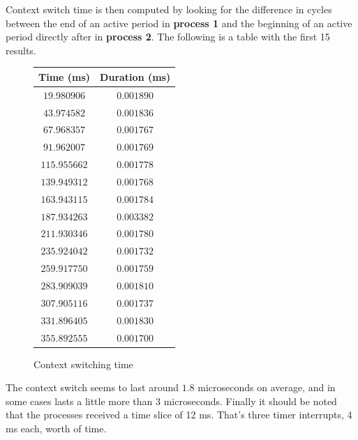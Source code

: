 \documentclass[oneside]{amsart}
\theoremstyle{definition}
\theoremstyle{remark}
\numberwithin{equation}{section}
\begin{document}
Context switch time is then computed by looking for the difference in cycles between the end of an
active period in \textbf{process 1} and the beginning of an active period directly after in
\textbf{process 2}. The following is a table with the first 15 results.

\begin{figure}[h]
    \caption{Context switching time}
    \begin{tabular}{c|c}
        \rowcolor{gray!50}
        Time (ms) & Duration (ms) \\
        \hline
        $19.980906 $ & $0.001890$ \\
        $43.974582 $ & $0.001836$ \\
        $67.968357 $ & $0.001767$ \\
        $91.962007 $ & $0.001769$ \\
        $115.955662$ & $0.001778$ \\
        $139.949312$ & $0.001768$ \\
        $163.943115$ & $0.001784$ \\
        $187.934263$ & $0.003382$ \\
        $211.930346$ & $0.001780$ \\
        $235.924042$ & $0.001732$ \\
        $259.917750$ & $0.001759$ \\
        $283.909039$ & $0.001810$ \\
        $307.905116$ & $0.001737$ \\
        $331.896405$ & $0.001830$ \\
        $355.892555$ & $0.001700$
    \end{tabular}
\end{figure}

The context switch seems to last around $1.8$ microseconds on average, and in some cases lasts
a little more than $3$ microseconds. Finally it should be noted that the processes received a time
slice of 12 ms. That's three timer interrupts, 4 ms each, worth of time. \\

\end{document}
